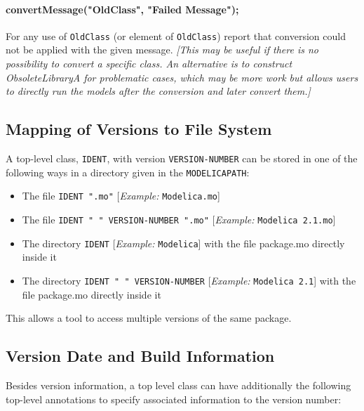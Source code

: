\paragraph*{convertMessage("OldClass", "Failed Message");}

For any use of \lstinline!OldClass! (or element of \lstinline!OldClass!) report that conversion
could not be applied with the given message. \emph{{[}This may be useful
if there is no possibility to convert a specific class. An alternative
is to construct ObsoleteLibraryA for problematic cases, which may be
more work but allows users to directly run the models after the
conversion and later convert them.{]}}

\subsection{Mapping of Versions to File System}

A top-level class, \lstinline!IDENT!, with version \lstinline!VERSION-NUMBER! can be stored in
one of the following ways in a directory given in the \lstinline!MODELICAPATH!:

\begin{itemize}
\item
  The file \lstinline!IDENT ".mo"! {[}\emph{Example:} \lstinline!Modelica.mo!{]}
\item
  The file \lstinline!IDENT " " VERSION-NUMBER ".mo"! {[}\emph{Example:} \lstinline!Modelica 2.1.mo!{]}
\item
  The directory \lstinline!IDENT! {[}\emph{Example:} \lstinline!Modelica!{]} with the file
  package.mo directly inside it
\item
  The directory \lstinline!IDENT " " VERSION-NUMBER! {[}\emph{Example:}
	\lstinline!Modelica 2.1!{]} with the file package.mo directly inside it
\end{itemize}

This allows a tool to access multiple versions of the same package.

\subsection{Version Date and Build Information}

Besides version information, a top level class can have additionally the
following top-level annotations to specify associated information to the
version number:


